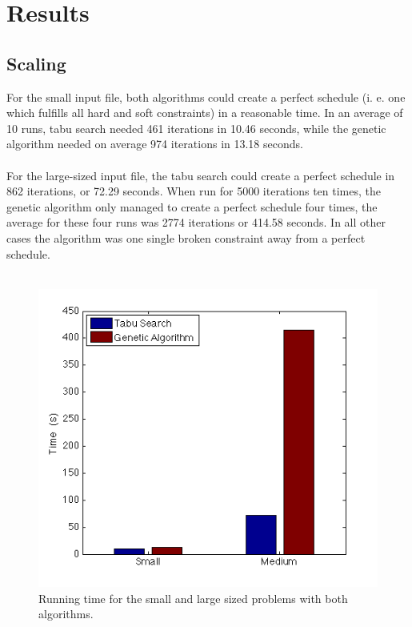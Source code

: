 \documentclass[titlepage,a4paper]{article}
\begin{document}
\pagebreak
\section{Results}
\subsection{Scaling}
For the small input file, both algorithms could create a perfect schedule (i. e. one which fulfills all hard and soft constraints) in a reasonable time. In an average of 10 runs, tabu search needed 461 iterations in 10.46 seconds, while the genetic algorithm needed on average 974 iterations in 13.18 seconds. \\\\
For the large-sized input file, the tabu search could create a perfect schedule in 862 iterations, or 72.29 seconds. When run for 5000 iterations ten times, the genetic algorithm only managed to create a perfect schedule four times, the average for these four runs was 2774 iterations or 414.58 seconds. In all other cases the algorithm was one single broken constraint away from a perfect schedule. \\\\

\begin{figure}[H]
  \centering
    \includegraphics[scale=0.5]{../results/time_bar_graph.png}
  \caption{Running time for the small and large sized problems with both algorithms.}
  \label{time_bar_graph}
\end{figure}
\end{document}
